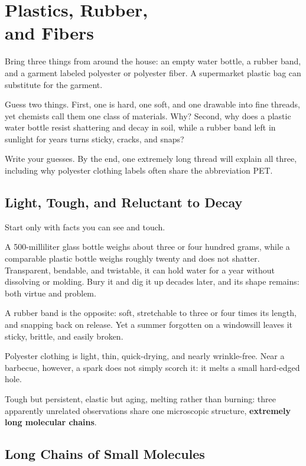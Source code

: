 \chapter[Plastics, Rubber, and Fibers]{Plastics, Rubber,\protect\\ and Fibers}

\begin{kaichang}
Bring three things from around the house: an empty water bottle, a rubber band, and a garment labeled polyester or polyester fiber. A supermarket plastic bag can substitute for the garment.

Guess two things. First, one is hard, one soft, and one drawable into fine threads, yet chemists call them one class of materials. Why? Second, why does a plastic water bottle resist shattering and decay in soil, while a rubber band left in sunlight for years turns sticky, cracks, and snaps?

Write your guesses. By the end, one extremely long thread will explain all three, including why polyester clothing labels often share the abbreviation PET.
\end{kaichang}

\section{Light, Tough, and Reluctant to Decay}

Start only with facts you can see and touch.

A 500-milliliter glass bottle weighs about three or four hundred grams, while a comparable plastic bottle weighs roughly twenty and does not shatter. Transparent, bendable, and twistable, it can hold water for a year without dissolving or molding. Bury it and dig it up decades later, and its shape remains: both virtue and problem.

A rubber band is the opposite: soft, stretchable to three or four times its length, and snapping back on release. Yet a summer forgotten on a windowsill leaves it sticky, brittle, and easily broken.

Polyester clothing is light, thin, quick-drying, and nearly wrinkle-free. Near a barbecue, however, a spark does not simply scorch it: it melts a small hard-edged hole.

Tough but persistent, elastic but aging, melting rather than burning: three apparently unrelated observations share one microscopic structure, \textbf{extremely long molecular chains}.

\section{Long Chains of Small Molecules}

